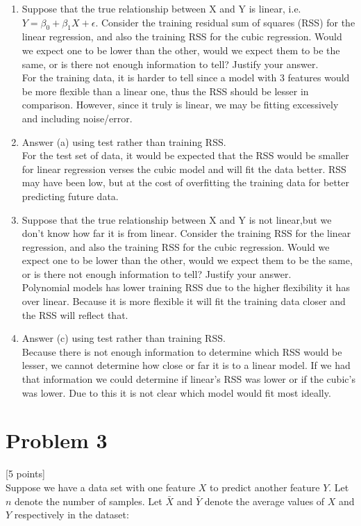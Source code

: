 \documentclass[12pt]{article}
\begin{document}
\begin{enumerate}
    \item Suppose that the true relationship between X and Y is linear, i.e. $Y = \beta_0 + \beta_1X + \epsilon$.  Consider the training residual sum of squares (RSS) for the linear regression, and also the training RSS for the cubic regression. Would we expect one to be lower than the other, would we expect them to be the same, or is there not enough information to tell? Justify your answer.\\ For the training data, it is harder to tell since a model with 3 features would be more flexible than a linear one, thus the RSS should be lesser in comparison. However, since it truly is linear, we may be fitting excessively and including noise/error.
    \item Answer (a) using test rather than training RSS.\\ For the test set of data, it would be expected that the RSS would be smaller for linear regression verses the cubic model and will fit the data better. RSS may have been low, but at the cost of overfitting the training data for better predicting future data.
    \item Suppose that the true relationship between X and Y is not linear,but we don't know how far it is from linear. Consider the training RSS for the linear regression, and also the training RSS for the cubic regression. Would we expect one to be lower than the other, would we expect them to be the same, or is there not enough information to tell? Justify your answer.\\ Polynomial models has lower training RSS due to the higher flexibility it has over linear. Because it is more flexible it will fit the training data closer and the RSS will reflect that.
    \item Answer (c) using test rather than training RSS.\\
          Because there is not enough information to determine which RSS would be lesser, we cannot determine how close or far it is to a linear model. If we had that information we could determine if linear's RSS was lower or if the cubic's was lower. Due to this it is not clear which model would fit most ideally.
\end{enumerate}

\pagebreak
\section*{Problem 3}
 [5 points]\\
Suppose we have a data set with one feature $X$ to predict another feature $Y$. Let $n$ denote the number of samples. Let $\bar{X}$ and $\bar{Y}$ denote the average values of $X$ and $Y$ respectively in the dataset:
\end{document}
